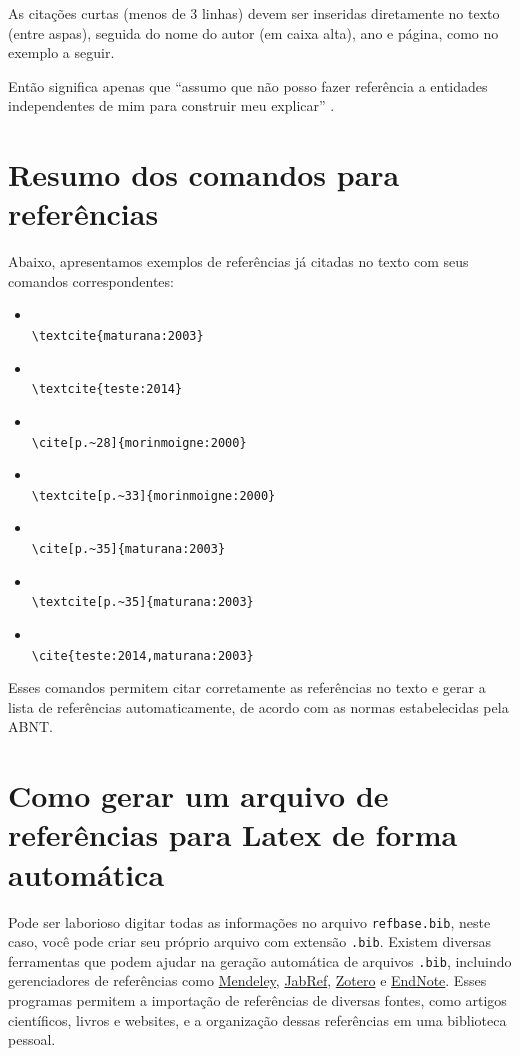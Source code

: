 As citações curtas (menos de 3 linhas) devem ser inseridas diretamente no texto (entre aspas), seguida do nome do autor (em caixa alta), ano e página, como no exemplo a seguir.

Então significa apenas que ``assumo que não posso fazer referência a entidades independentes de mim para construir meu explicar'' \cite[p.~35]{maturana:2003}.

\section{Resumo dos comandos para  referências }\label{referenciasUtilizadas}
Abaixo, apresentamos exemplos de referências já citadas no texto com seus comandos correspondentes:
\begin{itemize}
	\item \textcite{maturana:2003}\\ \verb|\textcite{maturana:2003}|
	\item \textcite{teste:2014}\\ \verb|\textcite{teste:2014}|
	\item \cite[p.~28]{morinmoigne:2000}\\ \verb|\cite[p.~28]{morinmoigne:2000}|
	\item \textcite[p.~33]{morinmoigne:2000}\\ \verb|\textcite[p.~33]{morinmoigne:2000}|
	\item \cite[p.~35]{maturana:2003}\\ \verb|\cite[p.~35]{maturana:2003}|
	\item \textcite[p.~35]{maturana:2003}\\ \verb|\textcite[p.~35]{maturana:2003}|
	\item \cite{teste:2014,maturana:2003}\\ \verb|\cite{teste:2014,maturana:2003}|
\end{itemize}

Esses comandos permitem citar corretamente as referências no texto e gerar a lista de referências automaticamente, de acordo com as normas estabelecidas pela ABNT.


\section{Como gerar um arquivo de referências para Latex de forma automática}
Pode ser laborioso  digitar todas as informações no arquivo \verb|refbase.bib|, neste caso, você pode criar seu próprio arquivo com extensão \verb|.bib|. Existem diversas ferramentas que podem ajudar na geração automática de arquivos \verb|.bib|, incluindo gerenciadores de referências como \href{https://www.mendeley.com}{Mendeley}, \href{https://www.jabref.org}{JabRef}, \href{https://www.zotero.org}{Zotero} e \href{https://endnote.com}{EndNote}. Esses programas permitem a importação de referências de diversas fontes, como artigos científicos, livros e websites, e a organização dessas referências em uma biblioteca pessoal.

